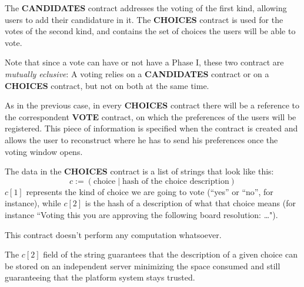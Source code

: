 \documentclass[submission, copyright,creativecommons,sharealike,noncommercial]{eptcs}
\newcommand{\Candidates}{\textbf{CANDIDATES}\xspace}
\newcommand{\Choices}{\textbf{CHOICES}\xspace}
\newcommand{\Vote}{\textbf{VOTE}\xspace}
\begin{document}
	The \Candidates contract addresses the voting of the first kind, allowing users to add their candidature in it. The \Choices contract is used for the votes of the second kind, and contains the set of choices the users will be able to vote. 
	
	Note that since a vote can have or not have a Phase I, these two contract are \emph{mutually eclusive}: A voting relies on a \Candidates contract or on a \Choices contract, but not on both at the same time.
	
	As in the previous case, in every \Choices contract there will be a reference to the correspondent \Vote contract, on which the preferences of the users will be registered. This piece of information is specified when the contract is created and allows the user to reconstruct where he has to send his preferences once the voting window opens.
	
	The data in the \Choices contract is a list of strings that look like this: 
	\[
	c := (\text{choice} \mid \text{hash of the choice description})
	\]
	$c[1]$ represents the kind of choice we are going to vote (``yes'' or ``no'', for instance), while $c[2]$ is the hash of a description of what that choice means (for instance ``Voting this you are approving the following board resolution: \dots"). 

	This contract doesn't perform any computation whatsoever.
	
	The $c[2]$ field of the string guarantees that the description of a given choice can be stored on an independent server minimizing the space consumed and still guaranteeing that the platform system stays trusted.	 
%
%
\end{document}

